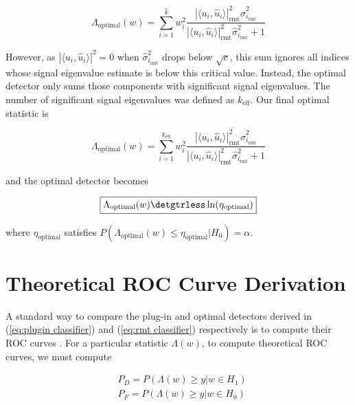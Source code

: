 \begin{equation*}
\Lambda_{\text{optimal}}(w)= \sum_{i=1}^{\widehat{k}}w_i^2\frac{|\langle u_i,\widehat{u}_i\rangle|^2_{\text{rmt}}\widehat{\sigma}_{i_\text{rmt}}^2}{|\langle u_i,\widehat{u}_i\rangle|^2_{\text{rmt}}\widehat{\sigma}_{i_\text{rmt}}^2 + 1}
\end{equation*}

However, as $|\langle u_i,\widehat{u}_i\rangle|^2=0$ when $\widehat{\sigma}_{i_\text{rmt}}^2$ drops below $\sqrt{c}$, this sum ignores all indices whose signal eigenvalue estimate is below this critical value. Instead, the optimal detector only sums those components with significant signal eigenvalues. The number of significant signal eigenvalues was defined as $k_\text{eff}$. Our final optimal statistic is

\begin{equation}\label{eq:rmt stat}
\boxed{\Lambda_{\text{optimal}}(w)= \sum_{i=1}^{k_\text{eff}}w_i^2\frac{|\langle u_i,\widehat{u}_i\rangle|^2_{\text{rmt}}\widehat{\sigma}_{i_\text{rmt}}^2}{|\langle u_i,\widehat{u}_i\rangle|^2_{\text{rmt}}\widehat{\sigma}_{i_\text{rmt}}^2 + 1}}
\end{equation}

and the optimal detector becomes

\begin{equation}\label{eq:rmt classifier}
\boxed{\Lambda_{\text{optimal}}(w) \detgtrless \ln(\eta_{\text{optimal}})}
\end{equation}

where $\eta_{\text{optimal}}$ satisfies $P(\Lambda_{\text{optimal}}(w)\leq\eta_{\text{optimal}}|H_0)=\alpha$.

\section{Theoretical ROC Curve Derivation}\label{sec:roc}

A standard way to compare the plug-in and optimal detectors derived in (\ref{eq:plugin classifier}) and (\ref{eq:rmt classifier}) respectively is to compute their ROC curves \cite{fawcett2006introduction}. For a particular statistic $\Lambda(w)$, to compute theoretical ROC curves, we must compute

\begin{equation}\label{eq:target cdf}
\begin{aligned}
&P_D = P(\Lambda(w) \geq y| w\in H_1)\\
&P_F = P(\Lambda(w) \geq y| w\in H_0)\\
\end{aligned}
\end{equation}

